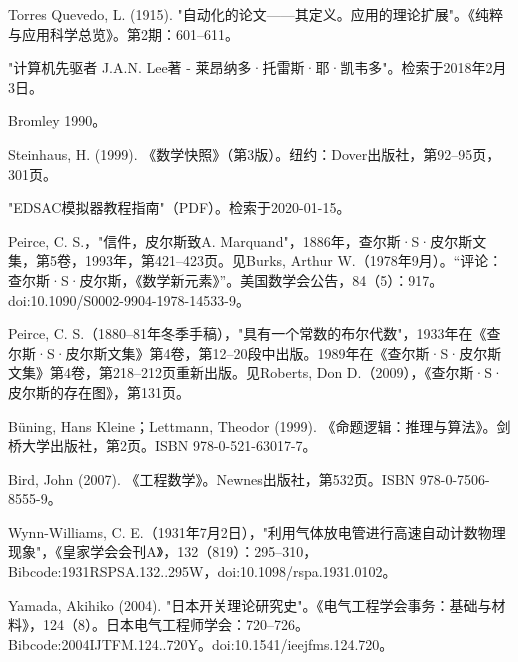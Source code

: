\begin{enumerate}
Torres Quevedo, L. (1915). "自动化的论文——其定义。应用的理论扩展"。《纯粹与应用科学总览》。第2期：601–611。

"计算机先驱者 J.A.N. Lee著 - 莱昂纳多·托雷斯·耶·凯韦多"。检索于2018年2月3日。

Bromley 1990。

Steinhaus, H. (1999). 《数学快照》（第3版）。纽约：Dover出版社，第92–95页，301页。

"EDSAC模拟器教程指南"（PDF）。检索于2020-01-15。

Peirce, C. S.，"信件，皮尔斯致A. Marquand"，1886年，查尔斯·S·皮尔斯文集，第5卷，1993年，第421–423页。见Burks, Arthur W.（1978年9月）。“评论：查尔斯·S·皮尔斯，《数学新元素》”。美国数学会公告，84（5）：917。doi:10.1090/S0002-9904-1978-14533-9。

Peirce, C. S.（1880–81年冬季手稿），"具有一个常数的布尔代数"，1933年在《查尔斯·S·皮尔斯文集》第4卷，第12–20段中出版。1989年在《查尔斯·S·皮尔斯文集》第4卷，第218–212页重新出版。见Roberts, Don D.（2009），《查尔斯·S·皮尔斯的存在图》，第131页。

Büning, Hans Kleine；Lettmann, Theodor (1999). 《命题逻辑：推理与算法》。剑桥大学出版社，第2页。ISBN 978-0-521-63017-7。

Bird, John (2007). 《工程数学》。Newnes出版社，第532页。ISBN 978-0-7506-8555-9。

Wynn-Williams, C. E.（1931年7月2日），"利用气体放电管进行高速自动计数物理现象"，《皇家学会会刊A》，132（819）：295–310，Bibcode:1931RSPSA.132..295W，doi:10.1098/rspa.1931.0102。

Yamada, Akihiko (2004). "日本开关理论研究史"。《电气工程学会事务：基础与材料》，124（8）。日本电气工程师学会：720–726。Bibcode:2004IJTFM.124..720Y。doi:10.1541/ieejfms.124.720。
\end{enumerate}